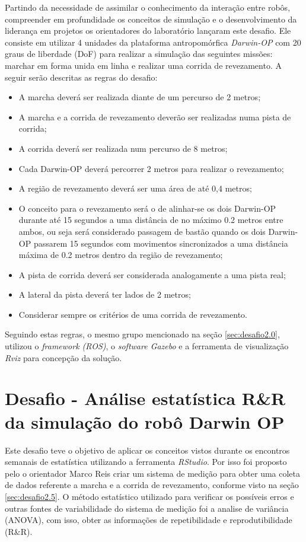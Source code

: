Partindo da necessidade de assimilar o conhecimento da interação entre robôs, compreender em profundidade os conceitos de simulação e o desenvolvimento da liderança em projetos os orientadores do laboratório lançaram este desafio. Ele consiste em utilizar 4 unidades da plataforma antropomórfica \textit{Darwin-OP} com 20 graus de liberdade (DoF) para realizar a simulação das seguintes missões: marchar em forma unida em linha e realizar uma corrida de revezamento. A seguir serão descritas as regras do desafio:

\begin{itemize}
  \item A marcha deverá ser realizada diante de um percurso de 2 metros;
  \item A marcha e a corrida de revezamento deverão ser realizadas numa pista de corrida;
  \item A corrida deverá ser realizada num percurso de 8 metros;
  \item Cada Darwin-OP deverá percorrer 2 metros para realizar o revezamento;
  \item A região de revezamento deverá ser uma área de até 0,4 metros;
  \item O conceito para o revezamento será o de alinhar-se os dois Darwin-OP durante até 15 segundos a uma distância de no máximo 0.2 metros entre ambos, ou seja será considerado passagem de bastão quando os dois Darwin-OP passarem 15 segundos com movimentos sincronizados a uma distância máxima de 0.2 metros dentro da
  região de revezamento;
  \item A pista de corrida deverá ser considerada analogamente a uma pista real;
  \item A lateral da pista deverá ter lados de 2 metros;
  \item Considerar sempre os critérios de uma corrida de revezamento.
\end{itemize}

Seguindo estas regras, o mesmo grupo mencionado na seção \ref{sec:desafio2.0}, utilizou o \textit{framework (ROS)}, o \textit{software {Gazebo}} e a ferramenta de visualização \textit{Rviz} para concepção da solução.

\section{Desafio - Análise estatística R\&R da simulação do robô Darwin OP}
\label{sec:estudo_estatisticoRR}

Este desafio teve o objetivo de aplicar os conceitos vistos durante os encontros semanais de estatística utilizando a ferramenta \textit{RStudio}. Por isso foi proposto pelo o orientador Marco Reis criar um sistema de medição para obter uma coleta de dados referente a marcha e a corrida de revezamento, conforme visto na seção \ref{sec:desafio2.5}. O método estatístico utilizado para verificar os possíveis erros e outras fontes de variabilidade do sistema de medição foi a analise de variância (ANOVA), com isso, obter as informações de repetibilidade e reprodutibilidade (R\&R).


